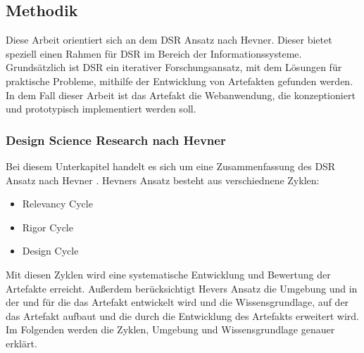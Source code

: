 \subsection{Methodik}
Diese Arbeit orientiert sich an dem \ac{DSR} Ansatz nach Hevner. Dieser bietet speziell einen Rahmen für \ac{DSR} im Bereich der Informationssysteme. Grundsätzlich ist \ac{DSR} ein iterativer Forschungsansatz, mit dem Lösungen für praktische Probleme, mithilfe der Entwicklung von Artefakten gefunden werden. In dem Fall dieser Arbeit ist das Artefakt die Webanwendung, die konzeptioniert und prototypisch implementiert werden soll. 

\subsubsection{Design Science Research nach Hevner}
Bei diesem Unterkapitel handelt es sich um eine Zusammenfassung des \ac{DSR} Ansatz nach Hevner \cite[S.~79-81]{Hevner2004}. Hevners Ansatz besteht aus verschiednene Zyklen:

\begin{itemize}
    \item Relevancy Cycle
    \item Rigor Cycle 
    \item Design Cycle
\end{itemize}

Mit diesen Zyklen wird eine systematische Entwicklung und Bewertung der Artefakte erreicht. Außerdem berücksichtigt Hevers Ansatz die Umgebung und  in der und für die das Artefakt entwickelt wird und die Wissensgrundlage, auf der das Artefakt aufbaut und die durch die Entwicklung des Artefakts erweitert wird. Im Folgenden werden die Zyklen, Umgebung und Wissensgrundlage genauer erklärt.

